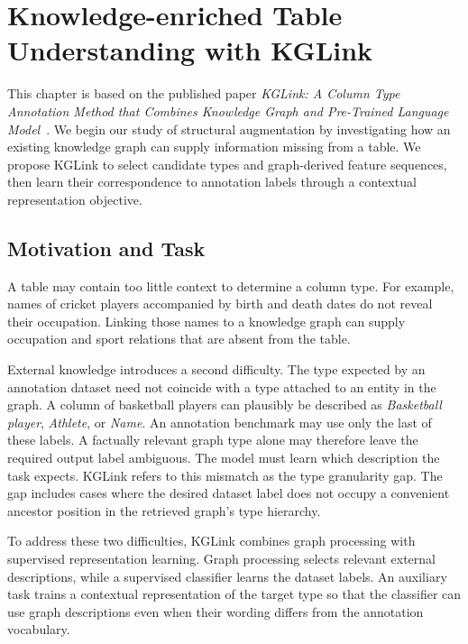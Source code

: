 \chapter{Knowledge-enriched Table Understanding with KGLink}
\label{ch:kglink}

This chapter is based on the published paper \emph{KGLink: A Column Type Annotation Method that Combines Knowledge Graph and Pre-Trained Language Model}~\cite{kglink-publication}. We begin our study of structural augmentation by investigating how an existing knowledge graph can supply information missing from a table. We propose KGLink to select candidate types and graph-derived feature sequences, then learn their correspondence to annotation labels through a contextual representation objective.

\section{Motivation and Task}
\label{sec:kglink:motivation}

A table may contain too little context to determine a column type. For example, names of cricket players accompanied by birth and death dates do not reveal their occupation. Linking those names to a knowledge graph can supply occupation and sport relations that are absent from the table.

External knowledge introduces a second difficulty. The type expected by an annotation dataset need not coincide with a type attached to an entity in the graph. A column of basketball players can plausibly be described as \emph{Basketball player}, \emph{Athlete}, or \emph{Name}. An annotation benchmark may use only the last of these labels. A factually relevant graph type alone may therefore leave the required output label ambiguous. The model must learn which description the task expects. KGLink refers to this mismatch as the type granularity gap. The gap includes cases where the desired dataset label does not occupy a convenient ancestor position in the retrieved graph's type hierarchy.

To address these two difficulties, KGLink combines graph processing with supervised representation learning. Graph processing selects relevant external descriptions, while a supervised classifier learns the dataset labels. An auxiliary task trains a contextual representation of the target type so that the classifier can use graph descriptions even when their wording differs from the annotation vocabulary.

